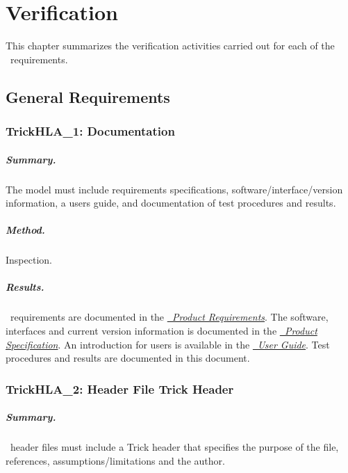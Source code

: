 \chapter{Verification}\label{sec:verification}

This chapter summarizes the verification activities carried out
for each of the \TrickHLA\ requirements.


\section{General Requirements}

\subsection{TrickHLA\_1: Documentation}
\paragraph{Summary.}
The model must include requirements specifications,
soft\-ware/\-inter\-face/\-version information,
a users guide, and
documentation of test procedures and results.
\paragraph{Method.}Inspection.
\paragraph{Results.}
\TrickHLA\ requirements are documented in
the \href{file:TrickHLAReqt.pdf} {\em \TrickHLA\ Product Requirements}.
The software, interfaces and current version information is documented in
the \href{file:TrickHLASpec.pdf} {\em \TrickHLA\ Product Specification}.
An introduction for users is available in
the \href{file:TrickHLAUser.pdf} {\em \TrickHLA\ User Guide}.
Test procedures and results are documented in this document.


\subsection{TrickHLA\_2: Header File Trick Header}
\paragraph{Summary.}
\TrickHLA\ header files must include a Trick header that specifies
the purpose of the file, references, assumptions/limitations and the author.
